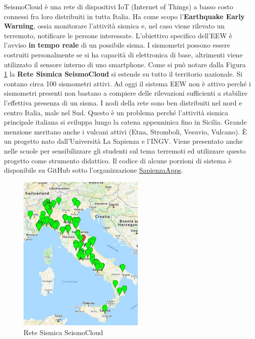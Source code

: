 \documentclass[a4paper,10pt]{memoir}
\begin{document}
SeismoCloud è una rete di dispositivi IoT (Internet of Things) a basso costo connessi fra loro distribuiti in tutta Italia.
Ha come scopo l'\textbf{Earthquake Early Warning}, ossia monitorare l'attività sismica e, nel caso viene rilevato un terremoto, notificare le persone interessate.
L'obiettivo specifico dell'EEW è l'avviso \textbf{in tempo reale} di un possibile sisma.
I sismometri possono essere costruiti personalmente se si ha capacità di elettronica di base, altrimenti viene utilizzato il sensore interno di uno smartphone.
Come si può notare dalla Figura \ref{fig:RSS} la \textbf{Rete Sismica SeismoCloud} si estende su tutto il territorio nazionale. Si contano circa 100 sismometri attivi.
Ad oggi il sistema EEW non è attivo perché i sismometri presenti non bastano a compiere delle rilevazioni sufficienti a stabilire l'effettiva presenza di un sisma.
I nodi della rete sono ben distribuiti nel nord e centro Italia, male nel Sud. Questo è un problema perché l'attività sismica principale italiana si sviluppa lungo la catena appenninica fino in Sicilia.
Grande menzione meritano anche i vulcani attivi (Etna, Stromboli, Vesuvio, Vulcano).
È un progetto nato dall'Università La Sapienza e l'INGV. Viene presentato anche nelle scuole per sensibilizzare gli studenti sul tema terremoti ed
utilizzare questo progetto come
strumento didattico.
Il codice di alcune porzioni di sistema è disponibile su GitHub sotto
l'organizzazione \href{https://github.com/SapienzaApps}{SapienzaApps}.

\begin{figure}[ht]
\centering
\caption{Rete Sismica SeismoCloud}
\label{fig:RSS}
\includegraphics[width=0.55\textwidth]{Chapter-1/seismoitalia.jpg}
\end{figure}
\end{document}
